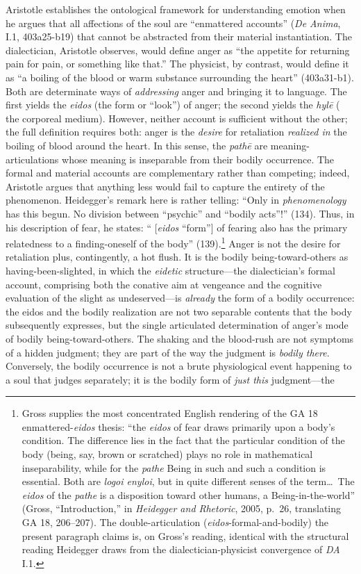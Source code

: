 Aristotle establishes the ontological framework for understanding emotion when he argues that all affections of the soul are ``enmattered accounts'' (\textit{De Anima}, I.1, 403a25-b19) that cannot be abstracted from their material instantiation. The dialectician, Aristotle observes, would define anger as ``the appetite for returning pain for pain, or something like that.'' The physicist, by contrast, would define it as ``a boiling of the blood or warm substance surrounding the heart'' (403a31-b1). Both are determinate ways of \textit{addressing} anger and bringing it to language. The first yields the \textit{eidos} (the form or ``look'') of anger; the second yields the \textit{hylē} ( the corporeal medium). However, neither account is sufficient without the other; the full definition requires both: anger is the \textit{desire} for retaliation \textit{realized in} the boiling of blood around the heart. In this sense, the \textit{pathē} are meaning-articulations whose meaning is inseparable from their bodily occurrence. The formal and material accounts are complementary rather than competing; indeed, Aristotle argues that anything less would fail to capture the entirety of the phenomenon. Heidegger's remark here is rather telling: ``Only in \textit{phenomenology} has this begun. No division between ``psychic'' and ``bodily acts''!'' (134). Thus, in his description of fear, he states: `` [\textit{eidos} ``form''] of fearing also has the primary relatedness to a finding-oneself of the body'' (139).\footnote{Gross supplies the most concentrated English rendering of the GA 18 enmattered-\textit{eidos} thesis: ``the \textit{eidos} of fear draws primarily upon a body's condition. The difference lies in the fact that the particular condition of the body (being, say, brown or scratched) plays no role in mathematical inseparability, while for the \textit{pathe} Being in such and such a condition is essential. Both are \textit{logoi enyloi}, but in quite different senses of the term\ldots\ The \textit{eidos} of the \textit{pathe} is a disposition toward other humans, a Being-in-the-world'' (Gross, ``Introduction,'' in \textit{Heidegger and Rhetoric}, 2005, p.~26, translating GA 18, 206--207). The double-articulation (\textit{eidos}-formal-and-bodily) the present paragraph claims is, on Gross's reading, identical with the structural reading Heidegger draws from the dialectician-physicist convergence of \textit{DA} I.1.} Anger is not the desire for retaliation plus, contingently, a hot flush. It is the bodily being-toward-others as having-been-slighted, in which the \textit{eidetic} structure---the dialectician's formal account, comprising both the conative aim at vengeance and the cognitive evaluation of the slight as undeserved---is \textit{already} the form of a bodily occurrence: the eidos and the bodily realization are not two separable contents that the body subsequently expresses, but the single articulated determination of anger's mode of bodily being-toward-others. The shaking and the blood-rush are not symptoms of a hidden judgment; they are part of the way the judgment is \textit{bodily there}. Conversely, the bodily occurrence is not a brute physiological event happening to a soul that judges separately; it is the bodily form of \textit{just this} judgment---the 